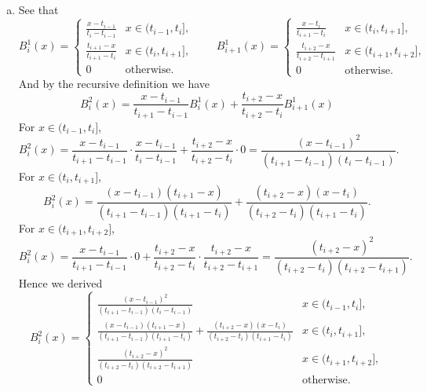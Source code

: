 \documentclass[11pt]{elegantbook}
\begin{document}
\begin{solution}
  \begin{enumerate}[(a)]
    \item See that
    \begin{equation*}
      B_i^1(x)=\left\{ \begin{array}{ll} 
        \frac{x-t_{i-1}}{t_i-t_{i-1}} & x\in(t_{i-1},t_i],\\
        \frac{t_{i+1}-x}{t_{i+1}-t_i} & x\in(t_i,t_{i+1}],\\
        0 & \text{otherwise}.
      \end{array} \right. \qquad 
      B_{i+1}^1(x)=\left\{ \begin{array}{ll} 
        \frac{x-t_{i}}{t_{i+1}-t_{i}} & x\in(t_{i},t_{i+1}],\\
        \frac{t_{i+2}-x}{t_{i+2}-t_{i+1}} & x\in(t_{i+1},t_{i+2}],\\
        0 & \text{otherwise}.
      \end{array} \right.
    \end{equation*}
    And by the recursive definition we have
    \begin{equation*}
      B_i^2(x)=\frac{x-t_{i-1}}{t_{i+1}-t_{i-1}}B_i^1(x)+\frac{t_{i+2}-x}{t_{i+2}-t_{i}}B_{i+1}^1(x)
    \end{equation*}
    For $x\in(t_{i-1},t_i]$, 
    \begin{equation*}
      B_i^2(x)=\frac{x-t_{i-1}}{t_{i+1}-t_{i-1}}\cdot \frac{x-t_{i-1}}{t_i-t_{i-1}}+\frac{t_{i+2}-x}{t_{i+2}-t_{i}}\cdot 0 = \frac{(x-t_{i-1})^2}{(t_{i+1}-t_{i-1})(t_i-t_{i-1})}.
    \end{equation*}
    For $x\in(t_{i},t_{i+1}]$, 
    \begin{equation*}
      B_i^2(x)=\frac{(x-t_{i-1})(t_{i+1}-x)}{(t_{i+1}-t_{i-1})(t_{i+1}-t_i)}+\frac{(t_{i+2}-x)(x-t_i)}{(t_{i+2}-t_{i})(t_{i+1}-t_{i})}.
    \end{equation*}
    For $x\in(t_{i+1},t_{i+2}]$, 
    \begin{equation*}
      B_i^2(x)=\frac{x-t_{i-1}}{t_{i+1}-t_{i-1}}\cdot 0+\frac{t_{i+2}-x}{t_{i+2}-t_{i}}\cdot \frac{t_{i+2}-x}{t_{i+2}-t_{i+1}} = \frac{(t_{i+2}-x)^2}{(t_{i+2}-t_{i})(t_{i+2}-t_{i+1})}.
    \end{equation*}
    Hence we derived
    \begin{equation}
      B_i^2(x)=\left\{ \begin{array}{ll} 
        \frac{(x-t_{i-1})^2}{(t_{i+1}-t_{i-1})(t_i-t_{i-1})} & x\in(t_{i-1},t_i],\\
        \frac{(x-t_{i-1})(t_{i+1}-x)}{(t_{i+1}-t_{i-1})(t_{i+1}-t_i)}+\frac{(t_{i+2}-x)(x-t_i)}{(t_{i+2}-t_{i})(t_{i+1}-t_{i})} & x\in(t_i,t_{i+1}],\\
        \frac{(t_{i+2}-x)^2}{(t_{i+2}-t_{i})(t_{i+2}-t_{i+1})} & x\in(t_{i+1},t_{i+2}],\\
        0 & \text{otherwise}.
      \end{array} \right.
    \end{equation}


\end{enumerate}
\end{solution}
\end{document}

